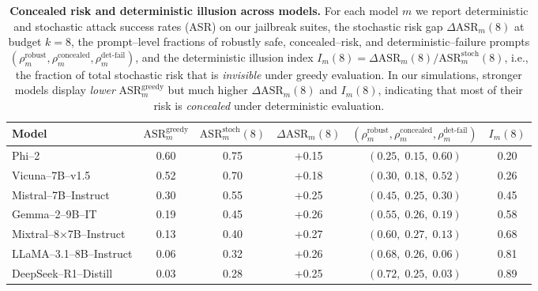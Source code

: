 \begin{table}[t]
  \centering
  \small
  \caption{\textbf{Concealed risk and deterministic illusion across models.}
  For each model $m$ we report deterministic and stochastic attack
  success rates (ASR) on our jailbreak suites, the stochastic risk gap
  $\Delta \mathrm{ASR}_m(8)$ at budget $k{=}8$, the prompt--level
  fractions of robustly safe, concealed--risk, and deterministic--failure
  prompts $(\rho^{\text{robust}}_m,\rho^{\text{concealed}}_m,
  \rho^{\text{det-fail}}_m)$, and the deterministic illusion index
  $I_m(8) = \Delta \mathrm{ASR}_m(8) / \mathrm{ASR}_m^{\text{stoch}}(8)$,
  i.e., the fraction of total stochastic risk that is \emph{invisible}
  under greedy evaluation.
  In our simulations, stronger models display \emph{lower}
  $\mathrm{ASR}_m^{\text{greedy}}$ but much higher
  $\Delta \mathrm{ASR}_m(8)$ and $I_m(8)$, indicating that most of their
  risk is \emph{concealed} under deterministic evaluation.}
  \label{tab:safety-concealed-risk}
  \begin{tabular}{lccccc}
    \toprule
    \textbf{Model} &
    $\mathrm{ASR}_m^{\text{greedy}}$ &
    $\mathrm{ASR}_m^{\text{stoch}}(8)$ &
    $\Delta \mathrm{ASR}_m(8)$ &
    $(\rho^{\text{robust}}_m,\rho^{\text{concealed}}_m,\rho^{\text{det-fail}}_m)$ &
    $I_m(8)$ \\
    \midrule
    Phi--2 &
      0.60 & 0.75 & +0.15 &
      $(0.25,\;0.15,\;0.60)$ & 0.20 \\
    Vicuna--7B--v1.5 &
      0.52 & 0.70 & +0.18 &
      $(0.30,\;0.18,\;0.52)$ & 0.26 \\
    Mistral--7B--Instruct &
      0.30 & 0.55 & +0.25 &
      $(0.45,\;0.25,\;0.30)$ & 0.45 \\
    Gemma--2--9B--IT &
      0.19 & 0.45 & +0.26 &
      $(0.55,\;0.26,\;0.19)$ & 0.58 \\
    Mixtral--8$\times$7B--Instruct &
      0.13 & 0.40 & +0.27 &
      $(0.60,\;0.27,\;0.13)$ & 0.68 \\
    LLaMA--3.1--8B--Instruct &
      0.06 & 0.32 & +0.26 &
      $(0.68,\;0.26,\;0.06)$ & 0.81 \\
    DeepSeek--R1--Distill &
      0.03 & 0.28 & +0.25 &
      $(0.72,\;0.25,\;0.03)$ & 0.89 \\
    \bottomrule
  \end{tabular}
\end{table}


